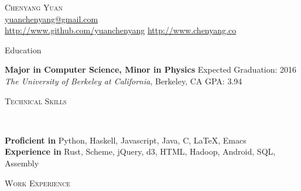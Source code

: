 \documentclass[9pt]{article}
\newenvironment{changemargin}[2]{%
  \begin{list}{}{%
      \setlength{\topsep}{0pt}%
      \setlength{\leftmargin}{#1}%
      \setlength{\rightmargin}{#2}%
      \setlength{\listparindent}{\parindent}%
      \setlength{\itemindent}{\parindent}%
      \setlength{\parsep}{\parskip}%
    }%
  \item[]}{\end{list}
}
\newcommand{\lineover}{
  \begin{changemargin}{-0.05in}{-0.05in}
    \vspace*{-8pt}
    \hrulefill \\
    \vspace*{-2pt}
  \end{changemargin}
}
\newcommand{\header}[1]{
  \begin{changemargin}{-0.5in}{-0.5in}
    \scshape{#1}\\
    \lineover
  \end{changemargin}
}
\newcommand{\contact}[4]{
  \begin{changemargin}{-0.5in}{-0.5in}
    \begin{center}
      {\Large \scshape {#1}}\\ \smallskip
      {#2}\\ \smallskip
      {#3}\\ \smallskip
      {#4}\smallskip
    \end{center}
  \end{changemargin}
}
\newenvironment{body} {
  \vspace*{-16pt}
  \begin{changemargin}{-0.25in}{-0.5in}
  }
  {\end{changemargin}
}
\begin{document}
\contact{Chenyang Yuan}{\href{mailto:yuanchenyang@gmail.com}{yuanchenyang@gmail.com}}{ \url{http://www.github.com/yuanchenyang} \quad \url{http://www.chenyang.co}}

\header{Education}

\begin{body}
  \vspace{14pt}
  \textbf{Major in Computer Science, Minor in Physics} \hfill Expected Graduation: 2016 \\
  \emph{The University of Berkeley at California}, Berkeley, CA{} \hfill GPA: 3.94 \\
\end{body}

\smallskip

\header{Technical Skills}

\begin{body}
  \vspace{14pt}
  \textbf{Proficient in} Python, Haskell, Javascript, Java,  C, \LaTeX, Emacs \\
  \textbf{Experience in} Rust, Scheme, jQuery, d3, HTML, Hadoop, Android, SQL, Assembly
\end{body}

\smallskip



\header{Work Experience}
\end{document}
